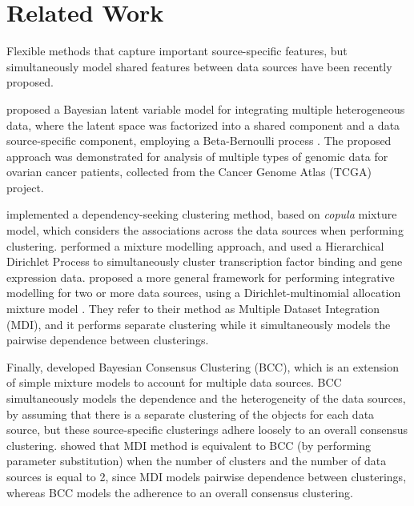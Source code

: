 \section{Related Work} \label{integr-related-work-sect}
Flexible methods that capture important source-specific features, but simultaneously model shared features between data sources have been recently proposed. 

\citet{Ray2012} proposed a Bayesian latent variable model for integrating multiple heterogeneous data, where the latent space was factorized into a shared component and a data source-specific component, employing a Beta-Bernoulli process \citep{Griffiths2005}. The proposed approach was demonstrated for analysis of multiple types of genomic data for ovarian cancer patients, collected from the Cancer Genome Atlas (TCGA) project.

\citet{Rey2012} implemented a dependency-seeking clustering method, based on \emph{copula} mixture model, which considers the associations across the data sources when performing clustering. \citet{Savage2010} performed a mixture modelling approach, and used a Hierarchical Dirichlet Process \citep{Ferguson1973, Escobar1995} to simultaneously cluster transcription factor binding and gene expression data. \citet{Kirk2012} proposed a more general framework for performing integrative modelling for two or more data sources, using a Dirichlet-multinomial allocation mixture model \citep{Green2001}. They refer to their method as Multiple Dataset Integration (MDI), and it performs separate clustering while it simultaneously models the pairwise dependence between clusterings. 

Finally, \citet{Lock2013} developed Bayesian Consensus Clustering (BCC), which is an extension of simple mixture models to account for multiple data sources. BCC simultaneously models the dependence and the heterogeneity of the data sources, by assuming that there is a separate clustering of the objects for each data source, but these source-specific clusterings adhere loosely to an overall consensus clustering. \citet{Lock2013} showed that MDI method is equivalent to BCC (by performing parameter substitution) when the number of clusters and the number of data sources is equal to 2, since MDI models pairwise dependence between clusterings, whereas BCC models the adherence to an overall consensus clustering.